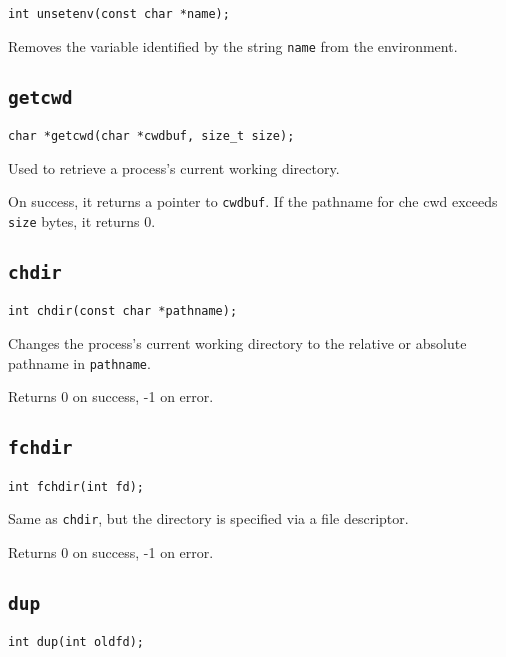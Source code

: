 \documentclass{article}
\begin{document}
\begin{verbatim}
int unsetenv(const char *name);
\end{verbatim}

Removes the variable identified by the string \texttt{name} from the environment.


\subsection{\texttt{getcwd}}

\begin{verbatim}
char *getcwd(char *cwdbuf, size_t size);
\end{verbatim}

Used to retrieve a process's current working directory.

On success, it returns a pointer to \texttt{cwdbuf}. If the pathname for che cwd exceeds \texttt{size} bytes, it returns 0.


\subsection{\texttt{chdir}}

\begin{verbatim}
int chdir(const char *pathname);
\end{verbatim}

Changes the process's current working directory to the relative or absolute pathname in \texttt{pathname}.

Returns 0 on success, -1 on error.


\subsection{\texttt{fchdir}}

\begin{verbatim}
int fchdir(int fd);
\end{verbatim}

Same as \texttt{chdir}, but the directory is specified via a file descriptor.

Returns 0 on success, -1 on error.


\subsection{\texttt{dup}}

\begin{verbatim}
int dup(int oldfd);
\end{verbatim}
\end{document}
